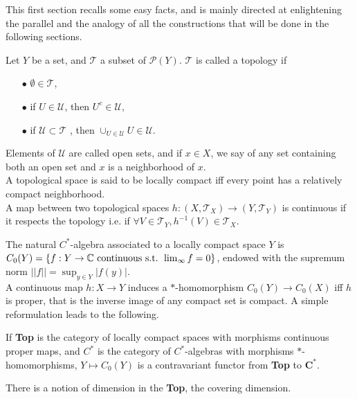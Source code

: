 This first section recalls some easy facts, and is mainly directed at enlightening the parallel and the analogy of all the constructions that will be done in the following sections.\\

\begin{definition}
Let $Y$ be a set, and $\mathcal T$ a subset of $\mathcal P(Y)$. $\mathcal T$ is called a topology if 
\begin{itemize}
\item[$\bullet$] $\emptyset \in \mathcal T$,
\item[$\bullet$] if $U\in\mathcal U$, then $U^c\in \mathcal U$,
\item[$\bullet$] if $\mathcal U\subset\mathcal T$ , then $\cup_{U\in \mathcal U} U \in \mathcal U$.
\end{itemize}
Elements of $\mathcal U$ are called open sets, and if $x\in X$, we  say of any set containing both an open set and $x$ is a neighborhood of $x$.\\
A topological space is said to be locally compact iff every point has a relatively compact neighborhood. \\
A map between two topological spaces $h : (X,\mathcal T_X)\rightarrow (Y,\mathcal T_Y)$ is continuous if it respects the topology i.e. if $\forall V\in \mathcal T_Y, h^{-1}(V)\in \mathcal T_X$.\\
\end{definition}

The natural $C^*$-algebra associated to a locally compact space $Y$ is $C_0(Y)=\{ f :Y \rightarrow \mathbb C \text{ continuous s.t. }\lim_{\infty}f=0\}$, endowed with the supremum norm $||f||=\sup_{y\in Y} |f(y)|$.\\

A continuous map $h : X\rightarrow Y $ induces a $*$-homomorphism $C_0(Y)\rightarrow C_0(X)$ iff $h$ is proper, that is the inverse image of any compact set is compact. A simple reformulation leads to the following.

\begin{prop}
If \textbf{Top} is the category of locally compact spaces with morphisms continuous proper maps, and $C^*$ is the category of $C^*$-algebras with morphisms $*$-homomorphisms, $Y\mapsto C_0(Y)$ is a contravariant functor from \textbf{Top} to $\textbf{C}^*$. 
\end{prop}

There is a notion of dimension in the \textbf{Top}, the covering dimension.

